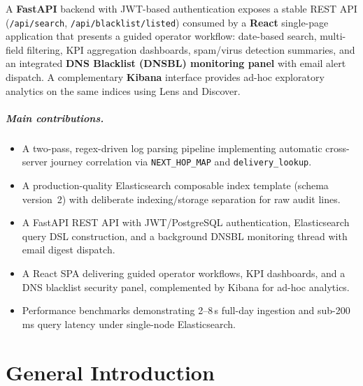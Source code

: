 \documentclass[12pt,a4paper,oneside]{report}
\begin{document}
A \textbf{FastAPI} backend with JWT-based authentication exposes a stable REST API (\texttt{/api/search}, \texttt{/api/blacklist/listed}) consumed by a \textbf{React} single-page application that presents a guided operator workflow: date-based search, multi-field filtering, KPI aggregation dashboards, spam/virus detection summaries, and an integrated \textbf{DNS Blacklist (DNSBL) monitoring panel} with email alert dispatch.
A complementary \textbf{Kibana} interface provides ad-hoc exploratory analytics on the same indices using Lens and Discover.

\paragraph{Main contributions.}
\begin{itemize}
  \item A two-pass, regex-driven log parsing pipeline implementing automatic cross-server journey correlation via \texttt{NEXT\_HOP\_MAP} and \texttt{delivery\_lookup}.
  \item A production-quality Elasticsearch composable index template (schema version~2) with deliberate indexing/storage separation for raw audit lines.
  \item A FastAPI REST API with JWT/PostgreSQL authentication, Elasticsearch query DSL construction, and a background DNSBL monitoring thread with email digest dispatch.
  \item A React SPA delivering guided operator workflows, KPI dashboards, and a DNS blacklist security panel, complemented by Kibana for ad-hoc analytics.
  \item Performance benchmarks demonstrating 2--8\,s full-day ingestion and sub-200\,ms query latency under single-node Elasticsearch.
\end{itemize}

\tableofcontents
\listoffigures
\listoftables

\clearpage

\chapter*{General Introduction}
{}
\end{document}
